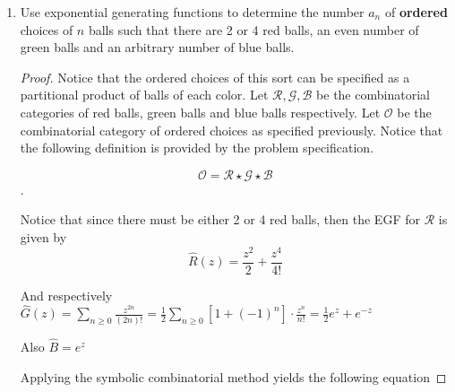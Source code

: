 \documentclass[12pt]{article}
\begin{document}
\begin{enumerate}
\begin{proof}
        Notice then, that an involution is a set of size $n$ made of cycles of size 2 or 1. This leads to the following combinatorial construction:
        
        $$ \mathcal{I} = SET ( \mathcal{F} + \mathcal{P})$$
        
        Where $\mathcal I$ is an involution, $\mathcal{F}$ is a fixed point (cycle of size 1) and $\mathcal{P}$ is a pair (cycle of length 2).
        
        Notice that there is only one possible fixed point of size 1 and only one possible pair of size 2. This implies that $\hat F (z) = z$ and $\hat P(z) = \displaystyle\frac{z^2}{2}$, are the EGFs for $\mathcal{F}$ and $\mathcal{P}$ respectively.
        
        The symbolic combinatorial method now yields the following EGF for involutions. $\hat I (z) = e^ {\displaystyle{z+\frac{z^2}{2}}}$
    \end{proof}
    
    \item Use exponential generating functions to determine the number $a_n$ of \textbf{ordered} choices of $n$ balls such that there are 2 or 4 red balls, an even number of green balls and an arbitrary number of blue balls.
    \begin{proof}
    Notice that the ordered choices of this sort can be specified as a partitional product of balls of each color. Let $\mathcal{R}, \mathcal{G}, \mathcal{B}$ be the combinatorial categories of red balls, green balls and blue balls respectively. Let $\mathcal{O}$ be the combinatorial category of ordered choices as specified previously. Notice that the following definition is provided by the problem specification.
    
    $$ \mathcal{O} = \mathcal{R} \star \mathcal{G} \star \mathcal{B}$$.
    
    Notice that since there must be either 2 or 4 red balls, then the EGF for $\mathcal{R}$ is given by
    $$ \hat{R}(z) = \displaystyle\frac{z^2}{2}+ \frac{z^4}{4!}$$
    
    And respectively $ \hat{G}(z) = \displaystyle\sum\limits_{n\geq 0} \frac{z^{2n}}{(2n)!} = \displaystyle \frac{1}{2} \displaystyle \sum \limits_{n \geq 0}[1 + (-1)^n] \cdot \frac{z^n}{n!} = \displaystyle \frac{1}{2} e^z + e^{-z}$ 
    
    Also $\hat{B} = e^z$
    
    Applying the symbolic combinatorial method yields the following equation
    

\end{proof}
\end{enumerate}
\end{document}
